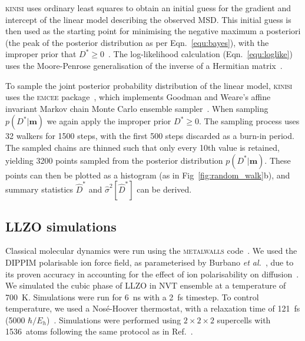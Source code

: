 \documentclass[reprint,superscriptaddress,nobibnotes,amsmath,amssymb,aps,prx,hidelinks,linenumbers]{revtex4-2}
\newcommand{\model}{\bm{m}}
\newcommand{\prob}[1]{\ensuremath{p(#1)}}
\newcommand{\Dest}{\ensuremath{\widehat{D}^*}}
\newcommand{\D}{\ensuremath{D^*}}
\newcommand{\varest}[1]{\ensuremath{\widehat{\sigma}^2[#1]}}
\begin{document}
\textsc{kinisi} uses ordinary least squares to obtain an initial guess for the gradient and intercept of the linear model describing the observed MSD.
This initial guess is then used as the starting point for minimising the negative maximum a posteriori (the peak of the posterior distribution as per Eqn.~\ref{equ:bayes}), with the improper prior that $\D \ge 0$~\cite{broyden_convergence_1970,fletcher_new_1970,goldfarb_family_1970,shanno_conditioning_1970}.
The log-likelihood calculation (Eqn.~\ref{equ:loglike}) uses the Moore-Penrose generalisation of the inverse of a Hermitian matrix~\cite{moore_on_1920,bjerhammar_application_1951,penrose_generlized_1955}. 

To sample the joint posterior probability distribution of the linear model, \textsc{kinisi} uses the \textsc{emcee} package~\cite{foremanmackey_emcee_2019}, which implements Goodman and Weare's affine invariant Markov chain Monte Carlo ensemble sampler~\cite{goodman_ensemble_2010}. 
When sampling $\prob{\D|\model}$ we again apply the improper prior $\D \ge 0$.
The sampling process uses \num{32} walkers for \num{1500} steps, with the first \num{500} steps discarded as a burn-in period.
The sampled chains are thinned such that only every 10th value is retained, yielding \num{3200} points sampled from the posterior distribution $\prob{\D|\model}$.
These points can then be plotted as a histogram (as in Fig~\ref{fig:random_walk}b), and summary statistics $\Dest$ and $\varest{\Dest}$ can be derived.

\subsection{LLZO simulations}
Classical molecular dynamics were run using the \textsc{metalwalls} code~\cite{marin_metalwalls_2020}. 
We used the DIPPIM polarisable ion force field, as parameterised by Burbano \emph{et al.}~\cite{burbano_sparse_2016}, due to its proven accuracy in accounting for the effect of ion polarisability on diffusion~\cite{wilson_polarization_1993,burbano_sparse_2016}. 
We simulated the cubic phase of LLZO in NVT ensemble at a temperature of \SI{700}{\kelvin}.
Simulations were run for \SI{6}{\nano\second} with a \SI{2}{\femto\second} timestep. 
To control temperature, we used a Nos\'{e}-Hoover thermostat, with a relaxation time of \SI{121}{\femto\second} (5000 $\hbar / E_{h}$)~\cite{nose_unified_1984,hoover_canonical_1985,martyna_nose_1992}. 
Simulations were performed using $2 \times 2 \times 2$ supercells with \SI{1536}{atoms} following the same protocol as in Ref.~.
\end{document}
